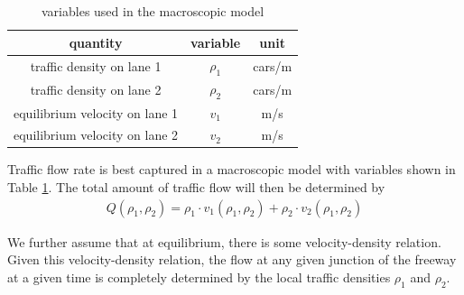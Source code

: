 \begin{table}[h]
	\begin{tabular}{|c|c|c|} \hline
	quantity & variable & unit \\ \hline
	traffic density on lane 1 & $\rho_1$ & cars/m \\ \hline
	traffic density on lane 2 & $\rho_2$ & cars/m \\ \hline
	equilibrium velocity on lane 1 & $v_1$ & m/s \\ \hline
	equilibrium velocity on lane 2 & $v_2$ & m/s \\ \hline
	\end{tabular}
	\caption{ variables used in the macroscopic model \label{tab:variables} }
	\end{table}	 
	Traffic flow rate is best captured in a macroscopic model with variables shown in Table \ref{tab:variables}. The total amount of traffic flow will then be determined by
	\begin{align}
	& Q(\rho_1,\rho_2) = \rho_1\cdot v_1(\rho_1,\rho_2)+\rho_2\cdot v_2(\rho_1,\rho_2) & \label{eq:flow}
	\end{align}
	
	We further assume that at equilibrium, there is some velocity-density relation. Given this velocity-density relation, the flow at any given junction of the freeway at a given time is completely determined by the local traffic densities $\rho_1$ and $\rho_2$.
	

	
